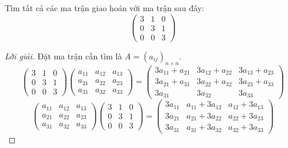 \begin{exercise}
    Tìm tất cả các ma trận giao hoán với ma trận sau đây:
    \[
        \begin{pmatrix}
            3 & 1 & 0 \\
            0 & 3 & 1 \\
            0 & 0 & 3
        \end{pmatrix}
    \]
\end{exercise}

\begin{proof}[Lời giải]
    Đặt ma trận cần tìm là $A = {(a_{ij})}_{n\times n}$.
    \[
        \begin{pmatrix}
            3 & 1 & 0 \\
            0 & 3 & 1 \\
            0 & 0 & 3
        \end{pmatrix}
        \begin{pmatrix}
            a_{11} & a_{12} & a_{13} \\
            a_{21} & a_{22} & a_{23} \\
            a_{31} & a_{32} & a_{33}
        \end{pmatrix}=
        \begin{pmatrix}
            3a_{11} + a_{21} & 3a_{12} + a_{22} & 3a_{13} + a_{23} \\
            3a_{21} + a_{31} & 3a_{22} + a_{32} & 3a_{23} + a_{33} \\
            3a_{31}          & 3a_{32}          & 3a_{33}
        \end{pmatrix}
    \]
    \[
        \begin{pmatrix}
            a_{11} & a_{12} & a_{13} \\
            a_{21} & a_{22} & a_{23} \\
            a_{31} & a_{32} & a_{33}
        \end{pmatrix}
        \begin{pmatrix}
            3 & 1 & 0 \\
            0 & 3 & 1 \\
            0 & 0 & 3
        \end{pmatrix}=
        \begin{pmatrix}
            3a_{11} & a_{11} + 3a_{12} & a_{12} + 3a_{13} \\
            3a_{21} & a_{21} + 3a_{22} & a_{22} + 3a_{23} \\
            3a_{31} & a_{31} + 3a_{32} & a_{32} + 3a_{33}
        \end{pmatrix}
\]
\end{proof}
